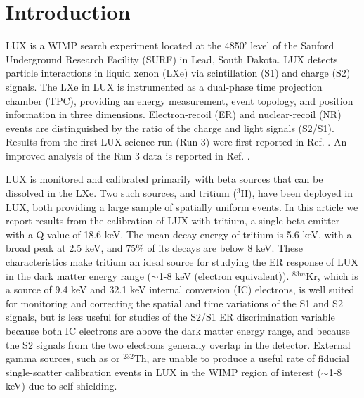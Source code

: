 \section{Introduction}

LUX is a WIMP search experiment located at the 4850' level of the Sanford Underground Research Facility (SURF) in Lead, South Dakota. LUX detects particle interactions in liquid xenon (LXe) via scintillation (S1) and charge (S2) signals. The LXe in LUX is instrumented as a dual-phase time projection chamber (TPC), providing an energy measurement, event topology, and position information in three dimensions. Electron-recoil (ER) and nuclear-recoil (NR) events are distinguished by the ratio of the charge and light signals (S2/S1). Results from the first LUX science run (Run 3) were first reported in Ref. \cite{lux-prl}. An improved analysis of the Run 3 data is reported in Ref. \cite{lux-reanalysis}.

LUX is monitored and calibrated primarily with beta sources that can be dissolved in the LXe. Two such sources,  \krsrc\cite{Kastens:2009rt, Baudis} and tritium ($^{3}$H), have been deployed in LUX, both providing a large sample of spatially uniform events. In this article we report results from the calibration of LUX with tritium, a single-beta emitter with a Q value of 18.6 keV\cite{Tritium_Q}. The mean decay energy of tritium is 5.6 keV, with a broad peak at 2.5 keV, and 75\% of its decays are below 8 keV\cite{Tritium_Mean,Tritium_Eq}. These characteristics make tritium an ideal source for studying the ER response of LUX in the dark matter energy range ($\sim$1-8 keV (electron equivalent)). $^{83m}$Kr, which is a source of 9.4 keV and 32.1 keV internal conversion  (IC) electrons, is well suited for monitoring and correcting the spatial and time variations of the S1 and S2 signals, but is less useful for studies of the S2/S1 ER discrimination variable because both IC electrons are above the dark matter energy range, and because the S2 signals from the two electrons generally overlap in the detector. External gamma sources, such as \cssrc or $^{232}$Th, are unable to produce a useful rate of fiducial single-scatter calibration events in LUX in the WIMP region of interest ($\sim$1-8 keV) due to self-shielding. 

